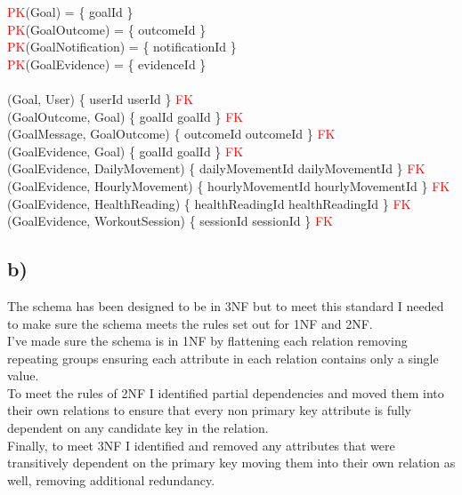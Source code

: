 \documentclass{article}
\begin{document}
\begin{zed}
\textcolor{red}{PK}(Goal) = \{ goalId \}  \\
\textcolor{red}{PK}(GoalOutcome) = \{ outcomeId \}  \\
\textcolor{red}{PK}(GoalNotification) = \{ notificationId \}  \\
\textcolor{red}{PK}(GoalEvidence) = \{ evidenceId \}  \\
\newline \\ 
(Goal, User) \mapsto \{ userId \mapsto userId \} \in \textcolor{red}{FK} \\
(GoalOutcome, Goal) \mapsto \{ goalId \mapsto goalId \} \in \textcolor{red}{FK} \\
(GoalMessage, GoalOutcome) \mapsto \{ outcomeId \mapsto outcomeId \} \in \textcolor{red}{FK} \\
(GoalEvidence, Goal) \mapsto \{ goalId \mapsto goalId \} \in \textcolor{red}{FK} \\
(GoalEvidence, DailyMovement) \mapsto \{ dailyMovementId \mapsto dailyMovementId \} \in \textcolor{red}{FK} \\
(GoalEvidence, HourlyMovement) \mapsto \{ hourlyMovementId \mapsto hourlyMovementId \} \in \textcolor{red}{FK} \\
(GoalEvidence, HealthReading) \mapsto \{ healthReadingId \mapsto healthReadingId \} \in \textcolor{red}{FK} \\
(GoalEvidence, WorkoutSession) \mapsto \{ sessionId \mapsto sessionId \} \in \textcolor{red}{FK} \\
\end{zed}

\subsection*{\small b)}

The schema has been designed to be in 3NF but to meet this standard I needed to make sure the schema meets the rules set out for 1NF and 2NF. \\
\newline
I've made sure the schema is in 1NF by flattening each relation removing repeating groups ensuring each attribute in each relation contains only a single value. \\ 
\newline
To meet the rules of 2NF I identified partial dependencies and moved them into their own relations to ensure that every non primary key attribute is fully dependent on any candidate key in the relation. \\
\newline
Finally, to meet 3NF I identified and removed any attributes that were transitively dependent on the primary key moving them into their own relation as well, removing additional redundancy. 
\end{document}
